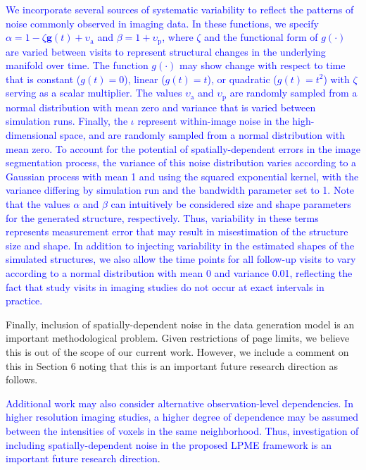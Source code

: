 \documentclass[12pt]{article}
\theoremstyle{definition}
\newcommand{\revision}[1]{\textcolor{blue}{#1}}
\begin{document}
\begin{enumerate}
\revision{We incorporate several sources of systematic variability to reflect the patterns of noise commonly observed in imaging data. In these functions, we specify $\alpha = 1 - \zeta\mathbf{g}(t) + \upsilon_{\text{a}}$ and $\beta = 1 + \upsilon_{\text{p}}$, where $\zeta$ and the functional form of $g(\cdot)$ are varied between visits to represent structural changes in the underlying manifold over time. The function $g(\cdot)$ may show change with respect to time that is constant ($g(t) = 0$), linear ($g(t) = t$), or quadratic ($g(t) = t^2$) with $\zeta$ serving as a scalar multiplier. The values $\upsilon_{\text{a}}$ and $\upsilon_{\text{p}}$ are randomly sampled from a normal distribution with mean zero and variance that is varied between simulation runs. Finally, the $\iota$ represent within-image noise in the high-dimensional space, and are randomly sampled from a normal distribution with mean zero. To account for the potential of spatially-dependent errors in the image segmentation process, the variance of this noise distribution varies according to a Gaussian process with mean 1 and using the squared exponential kernel, with the variance differing by simulation run and the bandwidth parameter set to 1. Note that the values $\alpha$ and $\beta$ can intuitively be considered size and shape parameters for the generated structure, respectively. Thus, variability in these terms represents measurement error that may result in misestimation of the structure size and shape. In addition to injecting variability in the estimated shapes of the simulated structures, we also allow the time points for all follow-up visits to vary according to a normal distribution with mean 0 and variance 0.01, reflecting the fact that study visits in imaging studies do not occur at exact intervals in practice.}

Finally, inclusion of spatially-dependent noise in the data generation model is an important methodological problem. Given restrictions of page limits, we believe this is out of the scope of our current work. However, we include a comment on this in Section 6 noting that this is an important future research direction as follows. 

\revision{Additional work may also consider alternative observation-level dependencies. In higher resolution imaging studies, a higher degree of dependence may be assumed between the intensities of voxels in the same neighborhood. Thus, investigation of including spatially-dependent noise in the proposed LPME framework is an important future research direction}.


\end{enumerate}
\end{document}
